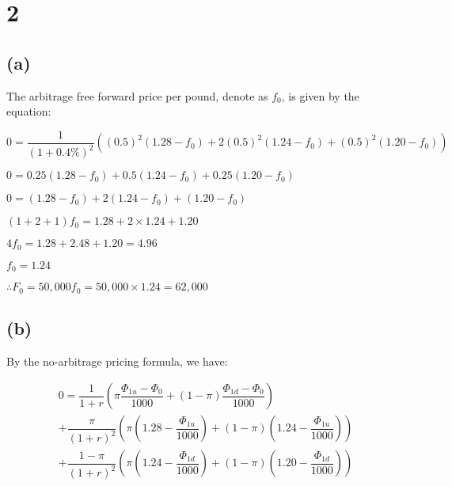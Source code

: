 \documentclass{article}
\begin{document}

\section*{2}

\subsection*{(a)}

The arbitrage free forward price per pound, denote as $f_{0}$, is given by the equation:

$0=\dfrac{1}{\left(1+0.4\%\right)^{2}}\left(\left(0.5\right)^{2}\left(1.28-f_{0}\right)+2\left(0.5\right)^{2}\left(1.24-f_{0}\right)+\left(0.5\right)^{2}\left(1.20-f_{0}\right)\right)$

$0=0.25\left(1.28-f_{0}\right)+0.5\left(1.24-f_{0}\right)+0.25\left(1.20-f_{0}\right)$

$0=\left(1.28-f_{0}\right)+2\left(1.24-f_{0}\right)+\left(1.20-f_{0}\right)$

$\left(1+2+1\right)f_{0}=1.28+2\times1.24+1.20$

$4f_{0}=1.28+2.48+1.20=4.96$

$f_{0}=1.24$

$\therefore F_{0}=50,000f_{0}=50,000\times1.24=\boxed{62,000}$

\subsection*{(b)}

By the no-arbitrage pricing formula, we have:

\begin{multline*}
    0=\dfrac{1}{1+r}\left(\pi\dfrac{\Phi_{1u}-\Phi_{0}}{1000}+\left(1-\pi\right)\dfrac{\Phi_{1d}-\Phi_{0}}{1000}\right)\\
    +\dfrac{\pi}{\left(1+r\right)^{2}}\left(\pi\left(1.28-\dfrac{\Phi_{1u}}{1000}\right)+\left(1-\pi\right)\left(1.24-\dfrac{\Phi_{1u}}{1000}\right)\right)\\
    +\dfrac{1-\pi}{\left(1+r\right)^{2}}\left(\pi\left(1.24-\dfrac{\Phi_{1d}}{1000}\right)+\left(1-\pi\right)\left(1.20-\dfrac{\Phi_{1d}}{1000}\right)\right)
\end{multline*}
\end{document}
